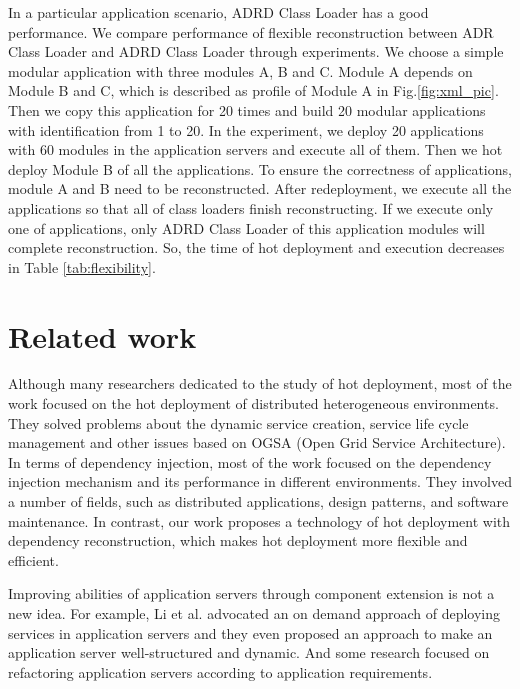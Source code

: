 \documentclass[conference]{IEEEtran}
\begin{document}
In a particular application scenario, ADRD Class Loader has a good performance. 
We compare performance of flexible reconstruction between ADR Class Loader and ADRD Class Loader through experiments.
We choose a simple modular application with three modules A, B and C.
Module A depends on Module B and C, which is described as profile of Module A in Fig.\ref{fig:xml_pic}.
Then we copy this application for 20 times and build 20 modular applications with identification from 1 to 20.
In the experiment, we deploy 20 applications with 60 modules in the application servers and execute all of them.
Then we hot deploy Module B of all the applications.
To ensure the correctness of applications, module A and B need to be reconstructed.
After redeployment, we execute all the applications so that all of class loaders finish reconstructing.
If we execute only one of applications, only ADRD Class Loader of this application modules will complete reconstruction.
So, the time of hot deployment and execution decreases in Table \ref{tab:flexibility}. 



\section{Related work\label{sec:relatedwork}}
Although many researchers dedicated to the study of hot deployment, most of the work focused on the hot deployment of distributed heterogeneous environments\cite{related_hot_1, related_hot_2, related_hot_3, related_hot_4}.
They solved problems about the dynamic service creation, service life cycle management and other issues based on OGSA (Open Grid Service Architecture).
In terms of dependency injection, most of the work focused on the dependency injection mechanism and its performance in different environments\cite{related_DI_1, related_DI_2, related_DI_3}.
They involved a number of fields, such as distributed applications, design patterns, and software maintenance.
In contrast, our work proposes a technology of hot deployment with dependency reconstruction, which makes hot deployment more flexible and efficient.

Improving abilities of application servers through component extension is not a new idea.
For example, Li et al. advocated an on demand approach of deploying services in application servers\cite{related_AS_1} and they even proposed an approach to make an application server well-structured and dynamic\cite{related_AS_2}.
And some research focused on refactoring application servers according to application requirements\cite{related_AS_3}.
	
\end{document}
